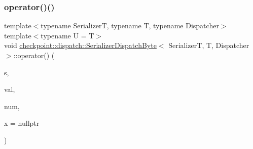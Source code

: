 \subsubsection{\texorpdfstring{operator()()}{operator()()}\hspace{0.1cm}{\footnotesize\ttfamily [1/2]}}
{\footnotesize\ttfamily template$<$typename SerializerT, typename T, typename Dispatcher$>$ \\
template$<$typename U  = T$>$ \\
void \hyperlink{structcheckpoint_1_1dispatch_1_1_serializer_dispatch_byte}{checkpoint\+::dispatch\+::\+Serializer\+Dispatch\+Byte}$<$ SerializerT, T, Dispatcher $>$\+::operator() (\begin{DoxyParamCaption}\item[{SerializerT \&}]{s,  }\item[{T $\ast$}]{val,  }\item[{\hyperlink{namespacecheckpoint_a083f6674da3f94c2901b18c6d238217c}{Serial\+Size\+Type}}]{num,  }\item[{\hyperlink{structcheckpoint_1_1dispatch_1_1_serializer_dispatch_byte_a7fd331c3b3693e8e69ae5cf7f5aeab93}{is\+Byte\+Copy\+Type}$<$ U $>$ $\ast$}]{x = {\ttfamily nullptr} }\end{DoxyParamCaption})\hspace{0.3cm}{\ttfamily [inline]}}

\mbox{\label{structcheckpoint_1_1dispatch_1_1_serializer_dispatch_byte_ae94c1edf6bab8281506605824c95b3b1}} 

